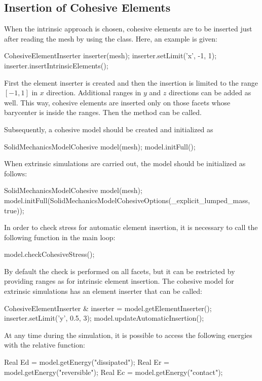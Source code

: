 \subsection{Insertion of Cohesive Elements}
When the intrinsic approach is chosen, cohesive elements are to be
inserted just after reading the mesh by using the
 class. Here, an example is given:
\begin{cpp}
  CohesiveElementInserter inserter(mesh);
  inserter.setLimit('x', -1, 1);
  inserter.insertIntrinsicElements();
\end{cpp}
First the element inserter is created and then the insertion is
limited to the range $[-1,1]$ in $x$ direction. Additional ranges in
$y$ and $z$ directions can be added as well. This way, cohesive
elements are inserted only on those facets whose barycenter is inside
the ranges. Then the method  can be called.

Subsequently, a cohesive model should be created and initialized as
\begin{cpp}
  SolidMechanicsModelCohesive model(mesh);
  model.initFull();
\end{cpp}

When extrinsic simulations are carried out, the model should be
initialized as follows:
\begin{cpp}
  SolidMechanicsModelCohesive model(mesh);
  model.initFull(SolidMechanicsModelCohesiveOptions(_explicit_lumped_mass, true));
\end{cpp}
In order to check stress for automatic element insertion, it is
necessary to call the following function in the main loop:
\begin{cpp}
  model.checkCohesiveStress();
\end{cpp}
By default the check is performed on all facets, but it can be
restricted by providing ranges as for intrinsic element insertion. The
cohesive model for extrinsic simulations has an element inserter that
can be called:
\begin{cpp}
  CohesiveElementInserter & inserter = model.getElementInserter();
  inserter.setLimit('y', 0.5, 3);
  model.updateAutomaticInsertion();
\end{cpp}

At any time during the simulation, it is possible to access the
following energies with the relative function:
\begin{cpp}
  Real Ed = model.getEnergy("dissipated");
  Real Er = model.getEnergy("reversible");
  Real Ec = model.getEnergy("contact");
\end{cpp}
